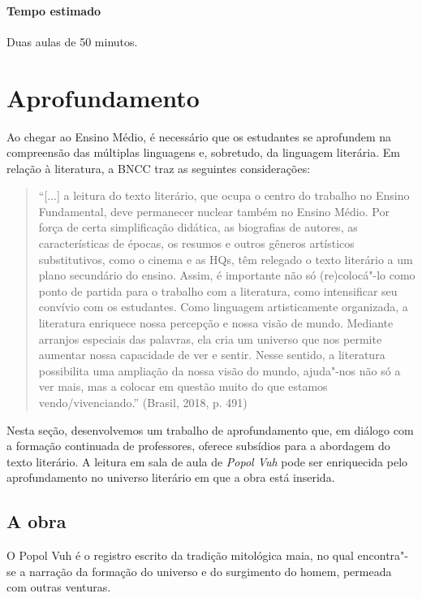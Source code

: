 \documentclass[12pt]{extarticle}
\begin{document}
\paragraph{Tempo estimado} Duas aulas de 50 minutos. 

\section{Aprofundamento}


Ao chegar ao Ensino Médio, é necessário que os estudantes se aprofundem
na compreensão das múltiplas linguagens e, sobretudo, da linguagem
literária. Em relação à literatura, a BNCC traz as seguintes
considerações:

\begin{quote}
``{[}...{]} a leitura do texto literário, que ocupa o centro do trabalho
no Ensino Fundamental, deve permanecer nuclear também no Ensino Médio.
Por força de certa simplificação didática, as biografias de autores, as
características de épocas, os resumos e outros gêneros artísticos
substitutivos, como o cinema e as HQs, têm relegado o texto literário a
um plano secundário do ensino. Assim, é importante não só (re)colocá"-lo
como ponto de partida para o trabalho com a literatura, como
intensificar seu convívio com os estudantes. Como linguagem
artisticamente organizada, a literatura enriquece nossa percepção e
nossa visão de mundo. Mediante arranjos especiais das palavras, ela cria
um universo que nos permite aumentar nossa capacidade de ver e sentir.
Nesse sentido, a literatura possibilita uma ampliação da nossa visão do
mundo, ajuda"-nos não só a ver mais, mas a colocar em questão muito do
que estamos vendo/vivenciando.'' (Brasil, 2018, p. 491)
\end{quote}

Nesta seção, desenvolvemos um trabalho de aprofundamento que, em diálogo
com a formação continuada de professores, oferece subsídios para a
abordagem do texto literário. A leitura em sala de aula de \emph{Popol
Vuh} pode ser enriquecida pelo aprofundamento no universo literário em
que a obra está inserida.


\subsection{A obra}

O Popol Vuh é o registro escrito da tradição mitológica maia, no qual
encontra"-se a narração da formação do universo e do surgimento do homem,
permeada com outras venturas.
\end{document}
